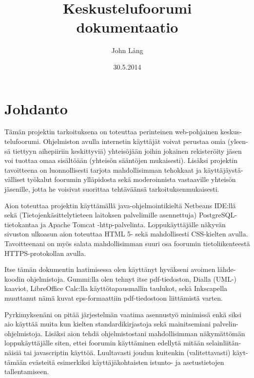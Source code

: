 \documentclass[11pt]{article}
\title{\textbf{Keskustelufoorumi}\\ \small{dokumentaatio}}
\author{John Lång}
\date{30.5.2014}
\begin{document}
\maketitle

\thispagestyle{empty}

\newpage
\tableofcontents
\thispagestyle{empty}

\newpage

\section{Johdanto}
	Tämän projektin tarkoituksena on toteuttaa perinteinen web-pohjainen keskus-telufoorumi. Ohjelmiston
	avulla internetin käyttäjät voivat perustaa omia (yleen-sä tiettyyn aihepiiriin keskittyviä) yhteisöjään
	joihin jokainen rekisteröity jäsen voi tuottaa omaa sisältöään (yhteisön sääntöjen mukaisesti). Lisäksi
	projektin tavoitteena on luonnollisesti tarjota mahdollisimman tehokkaat ja käyttäjäystä-välliset työkalut 
	foorumin ylläpidosta sekä moderoinnista vastaaville yhteisön jäsenille, jotta he voisivat suorittaa
	tehtäväänsä	tarkoituksenmukaisesti.
		
	Aion toteuttaa projektin käyttämällä java-ohjelmointikieltä Netbeans IDE:llä sekä (Tietojenkäsittelytieteen laitoksen
	palvelimille asennettuja) PostgreSQL-tietokantaa ja Apache Tomcat -http-palvelinta. Loppukäyttäjälle
	näkyvän sivuston ulkoasun aion toteuttaa HTML 5- sekä mahdollisesti CSS-kielten avulla. Tavoitteenani
	on myös salata mahdollisimman suuri osa foorumin tietoliikenteestä HTTPS-protokollan avulla.
	
	Itse tämän dokumentin laatimisessa olen käyttänyt hyväkseni avoimen lähde-koodin ohjelmistoja.
	Gummi:lla olen tehnyt itse pdf-tiedoston, Dialla (UML-)\\ kaaviot, LibreOffice Calc:lla käyttötapausmallin
	taulukot, sekä Inkscapella muuttanut nämä kuvat eps-formaattiin pdf-tiedostoon liittämistä varten.
	
	Pyrkimyksenäni on pitää järjestelmän vaatima asennustyö minimissä enkä siksi aio käyttää muita kun kielten
	standardikirjastoja sekä mainitsemiani palvelin-ohjelmistoja. Lisäksi aion tehdä ohjelmistostani mahdollisimman näkymättömän loppukäyttäjälle
	siten, ettei foorumin käyttäminen edellytä mitään selainliitän-näisiä tai javascriptin käyttöä. Luultavasti
	joudun kuitenkin (valitettavasti) käyt-tämään evästeitä esimerkiksi käyttäjäkohtaisten istunto- ja
	asetustietojen tallentamiseen.
	
\end{document}
